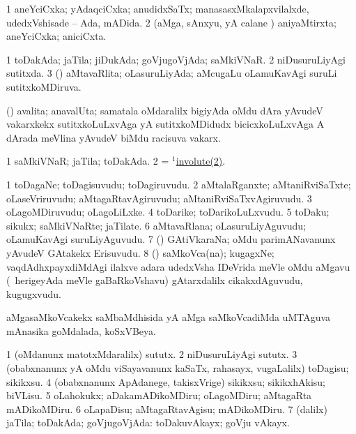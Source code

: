 \bentry
{}
\gl{\gu}
\bmng
\bnum
\num{1} aneYciCxka; yAdaqciCxka; anudidxSaTx; manasasxMkalapxvilalxde, udedxVshisade -- Ada, mADida. 
\num{2} (aMga, sAnxyu, yA calane \vi) aniyaMtirxta; aneYciCxka; aniciCxta. 
\enum
\emng
\eentry

\bentry
{}
\gl{\gu}
\bmng
\bnum
\num{1} toDakAda; jaTila; jiDukAda; goVjugoVjAda; saMkiVNaR. 
\hypertarget{involute(1)2}{} 
\num{2} niDusuruLiyAgi sutitxda. 
\num{3} (\savi) aMtavaRlita; oLasuruLiyAda; aMcugaLu oLamuKavAgi suruLi sutitxkoMDiruva. 
\enum
\emng
\eentry

\bentry
{}
\gl{\nA}
\bmng
(\jAyx) avalita; anavalUta; samatala oMdaralilx bigiyAda oMdu dAra yAvudeV vakarxkekx sutitxkoLuLxvAga yA sutitxkoMDidudx bicicxkoLuLxvAga A dArada meVlina yAvudeV biMdu racisuva vakarx.  
\emng
\eentry

\bentry
{}
\gl{\gu}
\bmng
\bnum
\num{1} saMkiVNaR; jaTila; toDakAda. 
\num{2} = \hyperlink{involute(1)2}{$^1$involute(2)}. 
\enum
\emng
\eentry

\bentry
{}
\gl{\nA}
\bmng
\bnum
\num{1} toDagaNe; toDagisuvudu; toDagiruvudu. 
\num{2} aMtalaRganxte; aMtaniRviSaTxte; oLaseVriruvudu; aMtagaRtavAgiruvudu; aMtaniRviSaTxvAgiruvudu. 
\num{3} oLagoMDiruvudu; oLagoLiLxke. 
\num{4} toDarike; toDarikoLuLxvudu. 
\num{5} toDaku; sikukx; saMkiVNaRte; jaTilate. 
\num{6} aMtavaRlana; oLasuruLiyAguvudu; oLamuKavAgi suruLiyAguvudu. 
\num{7} (\ga) GAtiVkaraNa; oMdu parimANavanunx yAvudeV GAtakekx Erisuvudu. 
\num{8} (\shavi) saMkoVca(na); kugagxNe; vaqdAdhxpayxdiMdAgi ilalxve adara udedxVsha IDeVrida meVle oMdu aMgavu (\kanmu\ herigeyAda meVle gaBaRkoVshavu) gAtarxdalilx cikakxdAguvudu, kugugxvudu. 
\enum
\emng
\eentry

\bentry
{}
\gl{\gu}
\bmng
aMgasaMkoVcakekx saMbaMdhisida yA aMga saMkoVcadiMda uMTAguva mAnasika goMdalada, koSxVBeya. 
\emng
\eentry

\bentry
{}
\gl{\sakirx}
\bmng
\bnum
\num{1} (oMdanunx matotxMdaralilx) sututx. 
\num{2} niDusuruLiyAgi sututx. 
\num{3} (obabxnanunx yA oMdu viSayavanunx kaSaTx, rahasayx, \mo vugaLalilx) toDagisu; sikikxsu. 
\num{4} (obabxnanunx ApAdanege, takisxVrige) sikikxsu; sikikxhAkisu; biVLisu. 
\num{5} oLahokukx; aDakamADikoMDiru; oLagoMDiru; aMtagaRta mADikoMDiru. 
\num{6} oLapaDisu; aMtagaRtavAgisu; mADikoMDiru. 
\num{7} (\BUkaq dalilx) jaTila; toDakAda; goVjugoVjAda:  toDakuvAkayx; goVju vAkayx. 
\enum
\emng
\eentry

